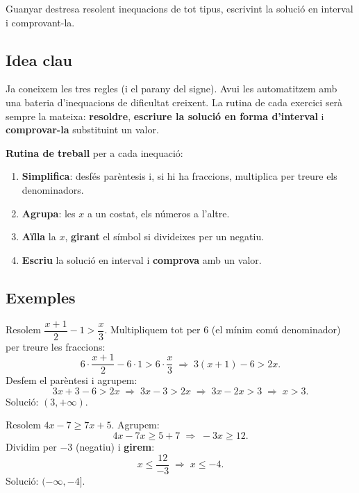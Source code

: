 %
{Guanyar destresa resolent inequacions de tot tipus, escrivint la solució en interval i comprovant-la.}

\subsection{Idea clau}

Ja coneixem les tres regles (i el parany del signe). Avui les automatitzem amb una
bateria d'inequacions de dificultat creixent. La rutina de cada exercici serà sempre
la mateixa: \textbf{resoldre}, \textbf{escriure la solució en forma d'interval} i
\textbf{comprovar-la} substituint un valor.

\begin{idea}
\textbf{Rutina de treball} per a cada inequació:
\begin{enumerate}[leftmargin=1.6em, itemsep=2pt]
  \item \textbf{Simplifica}: desfés parèntesis i, si hi ha fraccions, multiplica per
        treure els denominadors.
  \item \textbf{Agrupa}: les $x$ a un costat, els números a l'altre.
  \item \textbf{Aïlla} la $x$, \textbf{girant} el símbol si divideixes per un negatiu.
  \item \textbf{Escriu} la solució en interval i \textbf{comprova} amb un valor.
\end{enumerate}
\end{idea}

\subsection{Exemples}

\begin{exemple}
Resolem $\dfrac{x+1}{2}-1>\dfrac{x}{3}$. Multipliquem tot per $6$ (el mínim comú
denominador) per treure les fraccions:
\[
6\cdot\frac{x+1}{2}-6\cdot 1>6\cdot\frac{x}{3}
\;\Rightarrow\; 3(x+1)-6>2x.
\]
Desfem el parèntesi i agrupem:
\[
3x+3-6>2x \;\Rightarrow\; 3x-3>2x \;\Rightarrow\; 3x-2x>3 \;\Rightarrow\; x>3.
\]
Solució: $(3,+\infty)$.
\end{exemple}

\begin{exemple}
Resolem $4x-7\ge 7x+5$. Agrupem:
\[
4x-7x\ge 5+7 \;\Rightarrow\; -3x\ge 12.
\]
Dividim per $-3$ (negatiu) i \textbf{girem}:
\[
x\le \frac{12}{-3} \;\Rightarrow\; x\le -4.
\]
Solució: $(-\infty,-4]$.
\end{exemple}

